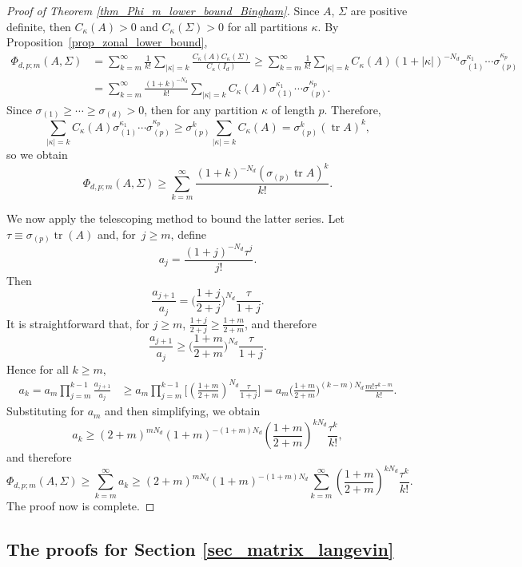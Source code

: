 \documentclass[pdftex]{sigma}
\numberwithin{equation}{section}
\def\tr {\mathop{\mathrm{tr}}}
\begin{document}
\begin{proof}[Proof of Theorem \ref{thm_Phi_m_lower_bound_Bingham}]
Since $A$, $\Sigma$ are positive definite, then $C_\kappa(A) > 0$ and $C_\kappa(\Sigma) > 0$ for all partitions $\kappa$. By Proposition~\ref{prop_zonal_lower_bound},
\begin{align*}
\Phi_{d,p;m}(A,\Sigma) &= \sum_{k=m}^\infty \frac{1}{k!} \sum_{|\kappa|=k} \frac{C_\kappa(A) C_\kappa(\Sigma)}{C_\kappa(I_d)} \ge \sum_{k=m}^\infty \frac{1}{k!} \sum_{|\kappa|=k} C_\kappa(A) (1+|\kappa|)^{-N_d} \sigma_{(1)}^{\kappa_1} \cdots \sigma_{(p)}^{\kappa_p} \\
&= \sum_{k=m}^\infty \frac{(1+k)^{-N_d}}{k!} \sum_{|\kappa|=k} C_\kappa(A) \sigma_{(1)}^{\kappa_1} \cdots \sigma_{(p)}^{\kappa_p}.
\end{align*}
Since $\sigma_{(1)} \ge \cdots \ge \sigma_{(d)} > 0$, then  for any partition $\kappa$ of length $p$. Therefore, \[
\sum_{|\kappa|=k} C_\kappa(A) \sigma_{(1)}^{\kappa_1} \cdots \sigma_{(p)}^{\kappa_p} \ge \sigma_{(p)}^{k} \sum_{|\kappa|=k} C_\kappa(A) = \sigma_{(p)}^k (\tr A)^k,
\]
so we obtain
\[
\Phi_{d,p;m}(A,\Sigma) \ge \sum_{k=m}^\infty \frac{(1+k)^{-N_d} (\sigma_{(p)} \tr A)^k}{k!}.
\]

We now apply the telescoping method to bound the latter series. Let $\tau \equiv \sigma_{(p)} \tr(A)$ and, for~${j \ge m}$, define
\[
a_j = \frac{(1+j)^{-N_d} \tau^j}{j!}.
\]
Then
\[
\frac{a_{j+1}}{a_j} = \bigl(\frac{1+j}{2+j}\bigr)^{N_d} \frac{\tau}{1+j}.
\]
It is straightforward that, for $j \ge m$,
$\frac{1+j}{2+j} \ge \frac{1+m}{2+m}$,
and therefore
\[
\frac{a_{j+1}}{a_j} \ge \bigl(\frac{1+m}{2+m}\bigr)^{N_d} \frac{\tau}{1+j}.
\]
Hence for all $k \ge m$,
\begin{align*}
a_k = a_m \prod_{j=m}^{k-1} \frac{a_{j+1}}{a_j} &\ge a_m \prod_{j=m}^{k-1} \bigg[\left(\frac{1+m}{2+m}\right)^{N_d} \frac{\tau}{1+j}\bigg] = a_m \Big(\frac{1+m}{2+m}\Big)^{(k-m)N_d} \frac{m! \tau^{k-m}}{k!}.
\end{align*}
Substituting for $a_m$ and then simplifying, we obtain
\[
a_k \ge (2+m)^{mN_d} (1+m)^{-(1+m)N_d} \left(\frac{1+m}{2+m}\right)^{kN_d} \frac{\tau^k}{k!},
\]
and therefore
\[
\Phi_{d,p;m}(A,\Sigma) \ge \sum_{k=m}^\infty a_k \ge (2+m)^{mN_d} (1+m)^{-(1+m)N_d} \sum_{k=m}^\infty \left(\frac{1+m}{2+m}\right)^{kN_d} \frac{\tau^k}{k!}.
\]
The proof now is complete.
\end{proof}


\subsection[The proofs for Section 3]{The proofs for Section \ref{sec_matrix_langevin}}
\label{sec_proofs_Psi_bounds}
\end{document}
